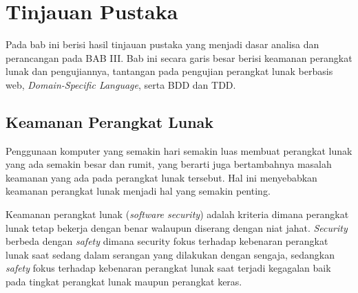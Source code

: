 \chapter{Tinjauan Pustaka}

Pada bab ini berisi hasil tinjauan pustaka yang menjadi dasar analisa dan perancangan pada BAB III.
Bab ini secara garis besar berisi keamanan perangkat lunak dan pengujiannya,
tantangan pada pengujian perangkat lunak berbasis web, \emph{Domain-Specific Language}, serta BDD dan TDD.



\section{Keamanan Perangkat Lunak}

Penggunaan komputer yang semakin hari semakin luas membuat perangkat lunak yang ada semakin besar dan rumit,
yang berarti juga bertambahnya masalah keamanan yang ada pada perangkat lunak tersebut.
Hal ini menyebabkan keamanan perangkat lunak menjadi hal yang semakin penting.

Keamanan perangkat lunak (\emph{software security}) adalah kriteria dimana perangkat lunak tetap bekerja dengan benar
walaupun diserang dengan niat jahat. \emph{Security} berbeda dengan \emph{safety} dimana security fokus terhadap kebenaran
perangkat lunak saat sedang dalam serangan yang dilakukan dengan sengaja, sedangkan \emph{safety} fokus terhadap
kebenaran perangkat lunak saat terjadi kegagalan baik pada tingkat perangkat lunak maupun perangkat keras.

